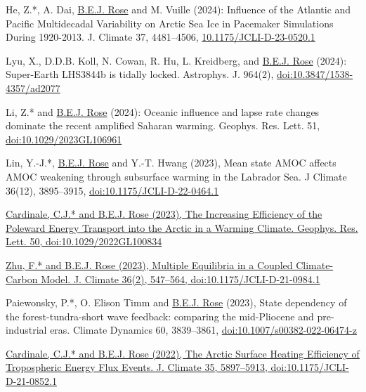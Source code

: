 \documentclass[11pt, letterpaper]{article} %
\newcommand{\years}[1]{\marginnote{\scriptsize #1}} %
\newcommand{\publink}{http://www.atmos.albany.edu/facstaff/brose/resources/Publications/}
\begin{document}
\years{2024}

He, Z.*, A. Dai, \underline{B.E.J. Rose} and M. Vuille (2024): Influence of the Atlantic and Pacific Multidecadal Variability on Arctic Sea Ice in Pacemaker Simulations During 1920-2013. J. Climate 37, 4481--4506, \href{https://doi.org/10.1175/JCLI-D-23-0520.1}{10.1175/JCLI-D-23-0520.1}
\vspace{0.2 cm}

Lyu, X., D.D.B. Koll, N. Cowan, R. Hu, L. Kreidberg, and \underline{B.E.J. Rose} (2024): Super-Earth LHS3844b is tidally locked. Astrophys. J. 964(2), \href{https://doi.org/10.3847/1538-4357/ad2077}{doi:10.3847/1538-4357/ad2077}
\vspace{0.2 cm}

Li, Z.* and \underline{B.E.J. Rose} (2024): Oceanic influence and lapse rate changes dominate the recent amplified Saharan warming. Geophys. Res. Lett. 51, \href{https://doi.org/10.1029/2023GL106961}{doi:10.1029/2023GL106961}
\vspace{0.2 cm}

\years{2023}

Lin, Y.-J.*, \underline{B.E.J. Rose} and Y.-T. Hwang (2023), Mean state AMOC affects AMOC weakening through subsurface warming in the Labrador Sea. J Climate 36(12), 3895--3915, \href{https://doi.org/10.1175/JCLI-D-22-0464.1}{doi:10.1175/JCLI-D-22-0464.1}
\vspace{0.2 cm}

\href{\publink Cardinale_Rose_GRL2023.pdf}{Cardinale, C.J.* and \underline{B.E.J. Rose} (2023), The Increasing Efficiency of the Poleward Energy Transport into the Arctic in a Warming Climate. Geophys. Res. Lett. 50, doi:10.1029/2022GL100834}
\vspace{0.2 cm} 

\href{\publink Zhu_Rose_JClim2023.pdf}{Zhu, F.* and \underline{B.E.J. Rose} (2023), Multiple Equilibria in a Coupled Climate-Carbon Model. J. Climate 36(2), 547--564, doi:10.1175/JCLI-D-21-0984.1}
\vspace{0.2 cm} 

Paiewonsky, P.*, O. Elison Timm and \underline{B.E.J. Rose} (2023), State dependency of the forest-tundra-short wave feedback: comparing the mid-Pliocene and pre-industrial eras. Climate Dynamics 60, 3839--3861, \href{https://doi.org/10.1007/s00382-022-06474-z}{doi:10.1007/s00382-022-06474-z}
\vspace{0.2 cm}

\years{2022}

\href{\publink Cardinale_Rose_JClim2022.pdf}{Cardinale, C.J.* and \underline{B.E.J. Rose} (2022), The Arctic Surface Heating Efficiency of Tropospheric Energy Flux Events. J. Climate 35, 5897--5913, doi:10.1175/JCLI-D-21-0852.1}
\vspace{0.2 cm} 
\end{document}
